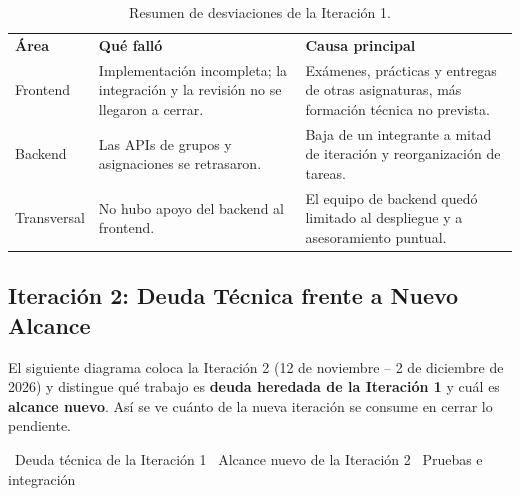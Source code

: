 \vspace{0.2cm}
\begin{table}[H]
\centering
\small
{}
\begin{tabularx}{\textwidth}{l X X}
\rowcolor{azulPastelApagado}
\textbf{\color{white}Área} & \textbf{\color{white}Qué falló} & \textbf{\color{white}Causa principal} \\
Frontend & Implementación incompleta; la integración y la revisión no se llegaron a cerrar. & Exámenes, prácticas y entregas de otras asignaturas, más formación técnica no prevista. \\
Backend & Las APIs de grupos y asignaciones se retrasaron. & Baja de un integrante a mitad de iteración y reorganización de tareas. \\
Transversal & No hubo apoyo del backend al frontend. & El equipo de backend quedó limitado al despliegue y a asesoramiento puntual. \\
\end{tabularx}
\caption{Resumen de desviaciones de la Iteración 1.}
\end{table}

\subsection{Iteración 2: Deuda Técnica frente a Nuevo Alcance}

El siguiente diagrama coloca la Iteración 2 (12 de noviembre -- 2 de diciembre de 2026) y distingue qué trabajo es \textbf{deuda heredada de la Iteración 1} y cuál es \textbf{alcance nuevo}. Así se ve cuánto de la nueva iteración se consume en cerrar lo pendiente.

\begin{center}
\small
{}~Deuda técnica de la Iteración 1 \quad
{}~Alcance nuevo de la Iteración 2 \quad
{}~Pruebas e integración
\end{center}


